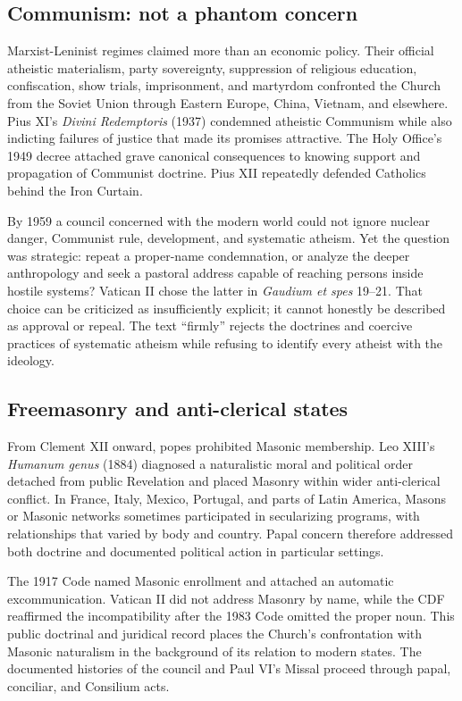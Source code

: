 \subsection{Communism: not a phantom concern}

Marxist-Leninist regimes claimed more than an economic policy. Their official atheistic materialism, party sovereignty, suppression of religious education, confiscation, show trials, imprisonment, and martyrdom confronted the Church from the Soviet Union through Eastern Europe, China, Vietnam, and elsewhere. Pius XI's \emph{Divini Redemptoris} (1937) condemned atheistic Communism while also indicting failures of justice that made its promises attractive. The Holy Office's 1949 decree attached grave canonical consequences to knowing support and propagation of Communist doctrine. Pius XII repeatedly defended Catholics behind the Iron Curtain.

By 1959 a council concerned with the modern world could not ignore nuclear danger, Communist rule, development, and systematic atheism. Yet the question was strategic: repeat a proper-name condemnation, or analyze the deeper anthropology and seek a pastoral address capable of reaching persons inside hostile systems? Vatican II chose the latter in \emph{Gaudium et spes} 19--21. That choice can be criticized as insufficiently explicit; it cannot honestly be described as approval or repeal. The text “firmly” rejects the doctrines and coercive practices of systematic atheism while refusing to identify every atheist with the ideology.

\subsection{Freemasonry and anti-clerical states}

From Clement XII onward, popes prohibited Masonic membership. Leo XIII's \emph{Humanum genus} (1884) diagnosed a naturalistic moral and political order detached from public Revelation and placed Masonry within wider anti-clerical conflict. In France, Italy, Mexico, Portugal, and parts of Latin America, Masons or Masonic networks sometimes participated in secularizing programs, with relationships that varied by body and country. Papal concern therefore addressed both doctrine and documented political action in particular settings.

The 1917 Code named Masonic enrollment and attached an automatic excommunication. Vatican II did not address Masonry by name, while the CDF reaffirmed the incompatibility after the 1983 Code omitted the proper noun. This public doctrinal and juridical record places the Church's confrontation with Masonic naturalism in the background of its relation to modern states. The documented histories of the council and Paul VI's Missal proceed through papal, conciliar, and Consilium acts.

